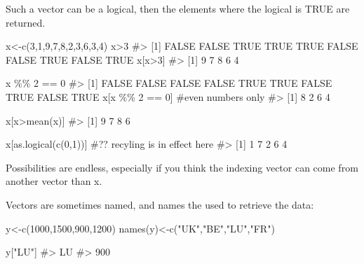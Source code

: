 \documentclass[
  letterpaper,
  DIV=11,
  numbers=noendperiod]{scrreprt}
\newenvironment{Shaded}{\begin{snugshade}}{\end{snugshade}}
\newcommand{\CommentTok}[1]{\textcolor[rgb]{0.37,0.37,0.37}{#1}}
\newcommand{\DecValTok}[1]{\textcolor[rgb]{0.68,0.00,0.00}{#1}}
\newcommand{\FunctionTok}[1]{\textcolor[rgb]{0.28,0.35,0.67}{#1}}
\newcommand{\NormalTok}[1]{\textcolor[rgb]{0.00,0.23,0.31}{#1}}
\newcommand{\OtherTok}[1]{\textcolor[rgb]{0.00,0.23,0.31}{#1}}
\newcommand{\SpecialCharTok}[1]{\textcolor[rgb]{0.37,0.37,0.37}{#1}}
\newcommand{\StringTok}[1]{\textcolor[rgb]{0.13,0.47,0.30}{#1}}
\begin{document}
Such a vector can be a logical, then the elements where the logical is
TRUE are returned.

\begin{Shaded}
\begin{Highlighting}[]
\NormalTok{x}\OtherTok{\textless{}{-}}\FunctionTok{c}\NormalTok{(}\DecValTok{3}\NormalTok{,}\DecValTok{1}\NormalTok{,}\DecValTok{9}\NormalTok{,}\DecValTok{7}\NormalTok{,}\DecValTok{8}\NormalTok{,}\DecValTok{2}\NormalTok{,}\DecValTok{3}\NormalTok{,}\DecValTok{6}\NormalTok{,}\DecValTok{3}\NormalTok{,}\DecValTok{4}\NormalTok{)}
\NormalTok{x}\SpecialCharTok{\textgreater{}}\DecValTok{3}
\CommentTok{\#\textgreater{}  [1] FALSE FALSE  TRUE  TRUE  TRUE FALSE FALSE  TRUE FALSE  TRUE}
\NormalTok{x[x}\SpecialCharTok{\textgreater{}}\DecValTok{3}\NormalTok{]}
\CommentTok{\#\textgreater{} [1] 9 7 8 6 4}

\NormalTok{x }\SpecialCharTok{\%\%} \DecValTok{2} \SpecialCharTok{==} \DecValTok{0}
\CommentTok{\#\textgreater{}  [1] FALSE FALSE FALSE FALSE  TRUE  TRUE FALSE  TRUE FALSE  TRUE}
\NormalTok{x[x }\SpecialCharTok{\%\%} \DecValTok{2} \SpecialCharTok{==} \DecValTok{0}\NormalTok{] }\CommentTok{\#even numbers only}
\CommentTok{\#\textgreater{} [1] 8 2 6 4}

\NormalTok{x[x}\SpecialCharTok{\textgreater{}}\FunctionTok{mean}\NormalTok{(x)]}
\CommentTok{\#\textgreater{} [1] 9 7 8 6}

\NormalTok{x[}\FunctionTok{as.logical}\NormalTok{(}\FunctionTok{c}\NormalTok{(}\DecValTok{0}\NormalTok{,}\DecValTok{1}\NormalTok{))] }\CommentTok{\#?? recyling is in effect here}
\CommentTok{\#\textgreater{} [1] 1 7 2 6 4}
\end{Highlighting}
\end{Shaded}

Possibilities are endless, especially if you think the indexing vector
can come from another vector than x.

Vectors are sometimes named, and names the used to retrieve the data:

\begin{Shaded}
\begin{Highlighting}[]
\NormalTok{y}\OtherTok{\textless{}{-}}\FunctionTok{c}\NormalTok{(}\DecValTok{1000}\NormalTok{,}\DecValTok{1500}\NormalTok{,}\DecValTok{900}\NormalTok{,}\DecValTok{1200}\NormalTok{)}
\FunctionTok{names}\NormalTok{(y)}\OtherTok{\textless{}{-}}\FunctionTok{c}\NormalTok{(}\StringTok{"UK"}\NormalTok{,}\StringTok{"BE"}\NormalTok{,}\StringTok{"LU"}\NormalTok{,}\StringTok{"FR"}\NormalTok{)}

\NormalTok{y[}\StringTok{"LU"}\NormalTok{]}
\CommentTok{\#\textgreater{}  LU }
\CommentTok{\#\textgreater{} 900}
\end{Highlighting}
\end{Shaded}
\end{document}
